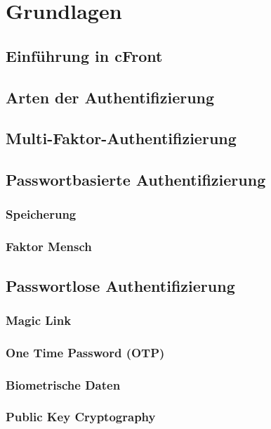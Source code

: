 \chapter{Grundlagen}

\section{Einführung in cFront}

\section{Arten der Authentifizierung}

\section{Multi-Faktor-Authentifizierung}

\section{Passwortbasierte Authentifizierung}

\subsection{Speicherung}

\subsection{Faktor Mensch}

\section{Passwortlose Authentifizierung}

\subsection{Magic Link}

\subsection{One Time Password (OTP)}

\subsection{Biometrische Daten}

\subsection{Public Key Cryptography}

